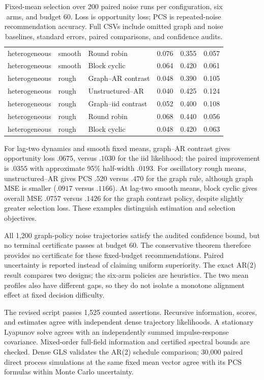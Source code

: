 \begin{table}[p]
\begin{tabular}{lllrrr}
heterogeneous & smooth & Round robin & 0.076 & 0.355 & 0.057 \\
heterogeneous & smooth & Block cyclic & 0.064 & 0.420 & 0.061 \\
heterogeneous & rough & Graph--AR contrast & 0.048 & 0.390 & 0.105 \\
heterogeneous & rough & Unstructured--AR & 0.040 & 0.425 & 0.124 \\
heterogeneous & rough & Graph--iid contrast & 0.052 & 0.400 & 0.108 \\
heterogeneous & rough & Round robin & 0.068 & 0.440 & 0.056 \\
heterogeneous & rough & Block cyclic & 0.048 & 0.420 & 0.063 \\
\bottomrule
\end{tabular}


\caption{Fixed-mean selection over 200 paired noise runs per configuration, six arms, and budget 60. Loss is opportunity loss; PCS is repeated-noise recommendation accuracy. Full CSVs include omitted graph and noise baselines, standard errors, paired comparisons, and confidence audits.}
\label{spatiotemporal_bandits:tab:results}
\end{table}

For lag-two dynamics and smooth fixed means, graph--AR contrast gives opportunity loss $.0675$, versus $.1030$ for the iid likelihood; the paired improvement is $.0355$ with approximate 95\% half-width $.0193$. For oscillatory rough means, unstructured--AR gives PCS $.520$ versus $.470$ for the graph rule, although graph MSE is smaller ($.0917$ versus $.1166$). At lag-two smooth means, block cyclic gives overall MSE $.0757$ versus $.1426$ for the graph contrast policy, despite slightly greater selection loss. These examples distinguish estimation and selection objectives.

All 1,200 graph-policy noise trajectories satisfy the audited confidence bound, but no terminal certificate passes at budget 60. The conservative theorem therefore provides no certificate for these fixed-budget recommendations. Paired uncertainty is reported instead of claiming uniform superiority. The exact AR(2) result compares two designs; the six-arm policies are heuristics. The two mean profiles also have different gaps, so they do not isolate a monotone alignment effect at fixed decision difficulty.

The revised script passes 1,525 counted assertions. Recursive information, scores, and estimates agree with independent dense trajectory likelihoods. A stationary Lyapunov solve agrees with an independently summed impulse-response covariance. Mixed-order full-field information and certified spectral bounds are checked. Dense GLS validates the AR(2) schedule comparison; 30,000 paired direct process simulations at the same fixed mean vector agree with its PCS formulas within Monte Carlo uncertainty.


